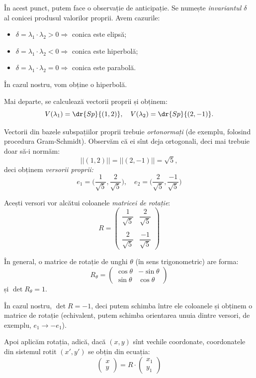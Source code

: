În acest punct, putem face o observație de anticipație. Se numește
\emph{invariantul $ \delta $} al conicei produsul valorilor proprii.
Avem cazurile:
\begin{itemize}
\item $ \delta = \lambda_1 \cdot \lambda_2 > 0 \Rightarrow $ conica este elipsă;
\item $ \delta = \lambda_1 \cdot \lambda_2 < 0 \Rightarrow $ conica este hiperbolă;
\item $ \delta = \lambda_1 \cdot \lambda_2 = 0 \Rightarrow $ conica este parabolă.
\end{itemize}

În cazul nostru, vom obține o hiperbolă.

Mai departe, se calculează vectorii proprii și obținem:
\[
  V(\lambda_1) = \dr{Sp} \{(1, 2) \}, \quad V(\lambda_2) = \dr{Sp} \{(2, -1) \}.
\]

Vectorii din bazele subspațiilor proprii trebuie \emph{ortonormați} (de exemplu,
folosind procedura Gram-Schmidt). Observăm că ei sînt deja ortogonali, deci
mai trebuie doar să-i normăm:
\[
  ||(1, 2)|| = ||(2, -1)|| = \sqrt{5},
\]
deci obținem \emph{versorii proprii:}
\[
  e_1 = \Big(\frac{1}{\sqrt{5}}, \frac{2}{\sqrt{5}} \Big), \quad %
  e_2 = \Big(\frac{2}{\sqrt{5}}, \frac{-1}{\sqrt{5}} \Big)
\]

Acești versori vor alcătui coloanele \emph{matricei de rotație}:
\[
  R = \begin{pmatrix}
    \dfrac{1}{\sqrt{5}} & \dfrac{2}{\sqrt{5}} \\
                       & \\
    \dfrac{2}{\sqrt{5}} & \dfrac{-1}{\sqrt{5}}
  \end{pmatrix}
\]

În general, o matrice de rotație de unghi $ \theta $ (în sens trigonometric)
are forma:
\[
  R_\theta = \begin{pmatrix}
    \cos \theta & -\sin \theta \\
    \sin \theta & \cos \theta
  \end{pmatrix}
\]
și $ \det R_\theta = 1 $.

În cazul nostru, $ \det R = -1 $, deci putem schimba între ele coloanele
și obținem o matrice de rotație (echivalent, putem schimba orientarea unuia
dintre versori, de exemplu, $ e_1 \longrightarrow -e_1 $).

Apoi aplicăm rotația, adică, dacă $ (x, y) $ sînt vechile coordonate,
coordonatele din sistemul rotit $ (x', y') $ se obțin din ecuația:
\[
  \begin{pmatrix}
    x \\ y
  \end{pmatrix} = R \cdot \begin{pmatrix} x_1 \\ y_1 \end{pmatrix}
\]

